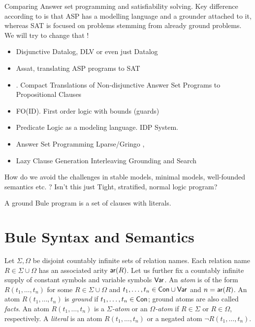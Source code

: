 \documentclass{new_tlp}
\begin{document}
Comparing Answer set programming and satisfiability solving. Key difference
according to \cite{Lierler17} is that ASP has a modelling language and a
grounder attached to it, whereas SAT is focused on problems stemming from
already ground problems. We will try to change that !


\begin{itemize}
    \item Disjunctive Datalog, DLV \cite{Eiter97} or even just Datalog \cite{Gottlob89}
    \item Assat, translating ASP programs to SAT \cite{Lin04}
    \item \cite{Janhunen11}. Compact Translations of Non-disjunctive Answer Set
        Programs to Propositional Clauses
    \item FO(ID). First order logic with bounds (guards) \cite{Wittocx10}
    \item Predicate Logic as a modeling language. IDP System. \cite{Cat18}
    \item Answer Set Programming Lparse/Gringo \cite{Gebser15}, \cite{Ferraris05}
    \item Lazy Clause Generation Interleaving Grounding and Search \cite{Cat15}
\end{itemize}

How do we avoid the challenges in stable models, minimal models, well-founded
semantics etc. ?  Isn't this just Tight, stratified, normal logic program?


A ground Bule program is a set of clauses with literals. 

\section{Bule Syntax and Semantics}

Let $\Sigma,\Omega$ be disjoint countably infinite sets of relation names. 
Each relation name $R\in \Sigma\cup\Omega$ has an associated arity $\mathsf{ar}(R)$. 
Let us further fix a countably infinite supply of constant symbols  and variable symbols $\mathsf{Var}$. 
An
\emph{atom} is of the form $R(t_1,\ldots,t_n)$ for some $R\in
\Sigma\cup\Omega$ and $t_1,\ldots,t_n\in\mathsf{Con}\cup\mathsf{Var}$ and
$n=\mathsf{ar}(R)$. 
An atom $R(t_1,\ldots,t_n)$ is \emph{ground} if $t_1,\ldots,t_n\in\mathsf{Con}$; ground atoms are also called \emph{facts}. An atom $R(t_1,\ldots,t_n)$ is a \emph{$\Sigma$-atom} or an \emph{$\Omega$-atom} if $R\in \Sigma$ or $R\in \Omega$, respectively. 
A \emph{literal} is an atom $R(t_1,\ldots,t_n)$ or a negated atom $\neg R(t_1,\ldots,t_n)$. 
\end{document}
